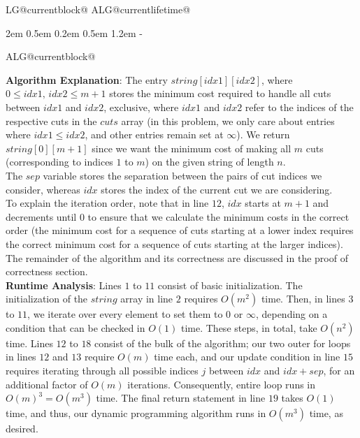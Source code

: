 \documentclass[11pt]{article}
\makeatletter
\newlength{\continueindent}
\renewenvironment{algorithmic}[1][0]%
   {%
   \edef\ALG@numberfreq{#1}%
   \def\@currentlabel{\theALG@line}%
   \setcounter{ALG@line}{0}%
   \setcounter{ALG@rem}{0}%
   \let\\\algbreak%
   \expandafter\edef\csname ALG@currentblock@\theALG@nested\endcsname{0}%
   \expandafter\let\csname ALG@currentlifetime@\theALG@nested\endcsname\relax%
   \begin{list}%
      {\ALG@step}%
      {%
      \rightmargin\z@%
      \itemsep\z@ \itemindent\z@ \listparindent2em%
      \partopsep\z@ \parskip\z@ \parsep\z@%
      \labelsep 0.5em \topsep 0.2em%
      \ifthenelse{\equal{#1}{0}}%
         {\labelwidth 0.5em}%
         {\labelwidth 1.2em}%
       \leftmargin\labelwidth \addtolength{\leftmargin}{\labelsep}
      \ALG@tlm\z@%
      }%
      \parshape 2 \leftmargin \linewidth \continueindent \dimexpr\linewidth-\continueindent\relax
   \setcounter{ALG@nested}{0}%
   \ALG@beginalgorithmic%
   }%
   {%
   \ALG@closeloops%
   \expandafter\ifnum\csname ALG@currentblock@\theALG@nested\endcsname=0\relax%
   \else%
      \PackageError{algorithmicx}{Some blocks are not closed!!!}{}%
   \fi%
   \ALG@endalgorithmic%
   \end{list}%
   }%
\makeatother
\begin{document}
\begin{enumerate}
\begin{minipage}[t]{0.9\textwidth}
\begin{algorithm}[H]
\begin{algorithmic}[1]
        \EndFor
        \EndFor
    \end{algorithmic}
    \end{algorithm}
\end{minipage}

    \vspace{1cm}

    \textbf{Algorithm Explanation}: The entry $string[idx1][idx2]$, where $0 \leq idx1, \, idx2 \leq m+1$ stores the minimum cost required to handle all cuts between $idx1$ and $idx2$, exclusive, where $idx1$ and $idx2$ refer to the indices of the respective cuts in the $cuts$ array (in this problem, we only care about entries where $idx1 \leq idx2$, and other entries remain set at $\infty$). We return $string[0][m+1]$ since we want the minimum cost of making all $m$ cuts (corresponding to indices $1$ to $m$) on the given string of length $n$. \\

    The $sep$ variable stores the separation between the pairs of cut indices we consider, whereas $idx$ stores the index of the current cut we are considering. \\
    
    To explain the iteration order, note that in line $12$, $idx$ starts at $m+1$ and decrements until $0$ to ensure that we calculate the minimum costs in the correct order (the minimum cost for a sequence of cuts starting at a lower index requires the correct minimum cost for a sequence of cuts starting at the larger indices). The remainder of the algorithm and its correctness are discussed in the proof of correctness section.\\

    
    \textbf{Runtime Analysis}: Lines $1$ to $11$ consist of basic initialization. The initialization of the $string$ array in line $2$ requires $O(m^2)$ time. Then, in lines $3$ to $11$, we iterate over every element to set them to $0$ or $\infty$, depending on a condition that can be checked in $O(1)$ time. These steps, in total, take $O(n^2)$ time. Lines $12$ to $18$ consist of the bulk of the algorithm; our two outer for loops in lines $12$ and $13$ require $O(m)$ time each, and our update condition in line $15$ requires iterating through all possible indices $j$ between $idx$ and $idx+sep$, for an additional factor of $O(m)$ iterations. Consequently, entire loop runs in $O(m)^3 = O(m^3)$ time. The final return statement in line $19$ takes $O(1)$ time, and thus, our dynamic programming algorithm runs in $O(m^3)$ time, as desired. \\


\end{enumerate}
\end{document}
